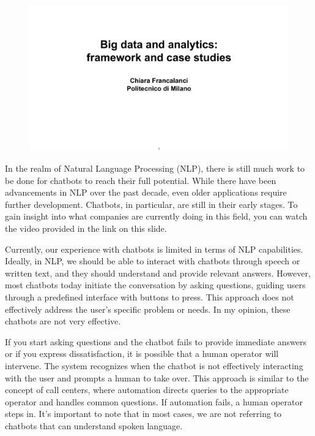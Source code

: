 \begin{figure}[!h]
    \centering
    \includegraphics[page=12, trim = 1.5cm 3.3cm 1.5cm 4cm, clip, width=\textwidth]{images/06 - BIG_DATA.pdf}
\end{figure}

In the realm of Natural Language Processing (NLP), there is still much
work to be done for chatbots to reach their full potential. While there
have been advancements in NLP over the past decade, even older
applications require further development. Chatbots, in particular, are
still in their early stages. To gain insight into what companies are
currently doing in this field, you can watch the video provided in the
link on this slide.

Currently, our experience with chatbots is limited in terms of NLP
capabilities. Ideally, in NLP, we should be able to interact with
chatbots through speech or written text, and they should understand and
provide relevant answers. However, most chatbots today initiate the
conversation by asking questions, guiding users through a predefined
interface with buttons to press. This approach does not effectively
address the user's specific problem or needs. In my opinion, these
chatbots are not very effective.

If you start asking questions and the chatbot fails to provide immediate
answers or if you express dissatisfaction, it is possible that a human
operator will intervene. The system recognizes when the chatbot is not
effectively interacting with the user and prompts a human to take over.
This approach is similar to the concept of call centers, where
automation directs queries to the appropriate operator and handles
common questions. If automation fails, a human operator steps in. It's
important to note that in most cases, we are not referring to chatbots
that can understand spoken language.

